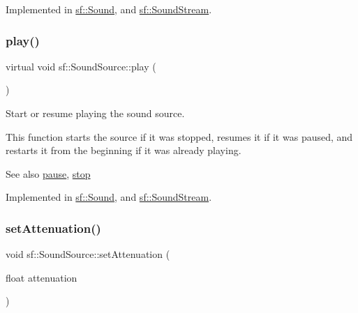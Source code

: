 Implemented in \mbox{\hyperlink{classsf_1_1_sound_a5eeb25815bfa8cdc4a6cc000b7b19ad5}{sf\+::\+Sound}}, and \mbox{\hyperlink{classsf_1_1_sound_stream_a932ff181e661503cad288b4bb6fe45ca}{sf\+::\+Sound\+Stream}}.

\mbox{\label{classsf_1_1_sound_source_a6e1bbb1f247ed8743faf3b1ed6f2bc21}} 
\subsubsection{\texorpdfstring{play()}{play()}}
{\footnotesize\ttfamily virtual void sf\+::\+Sound\+Source\+::play (\begin{DoxyParamCaption}{ }\end{DoxyParamCaption})\hspace{0.3cm}{\ttfamily [pure virtual]}}



Start or resume playing the sound source. 

This function starts the source if it was stopped, resumes it if it was paused, and restarts it from the beginning if it was already playing.

\begin{DoxySeeAlso}{See also}
\mbox{\hyperlink{classsf_1_1_sound_source_a21553d4e8fcf136231dd8c7ad4630aba}{pause}}, \mbox{\hyperlink{classsf_1_1_sound_source_a06501a25b12376befcc7ee1ed4865fda}{stop}} \begin{DoxyVerb}\end{DoxyVerb}
 
\end{DoxySeeAlso}


Implemented in \mbox{\hyperlink{classsf_1_1_sound_a2953ffe632536e72e696fd880ced2532}{sf\+::\+Sound}}, and \mbox{\hyperlink{classsf_1_1_sound_stream_afdc08b69cab5f243d9324940a85a1144}{sf\+::\+Sound\+Stream}}.

\mbox{\label{classsf_1_1_sound_source_aa2adff44cd2f8b4e3c7315d7c2a45626}} 
\subsubsection{\texorpdfstring{setAttenuation()}{setAttenuation()}}
{\footnotesize\ttfamily void sf\+::\+Sound\+Source\+::set\+Attenuation (\begin{DoxyParamCaption}\item[{float}]{attenuation }\end{DoxyParamCaption})}



